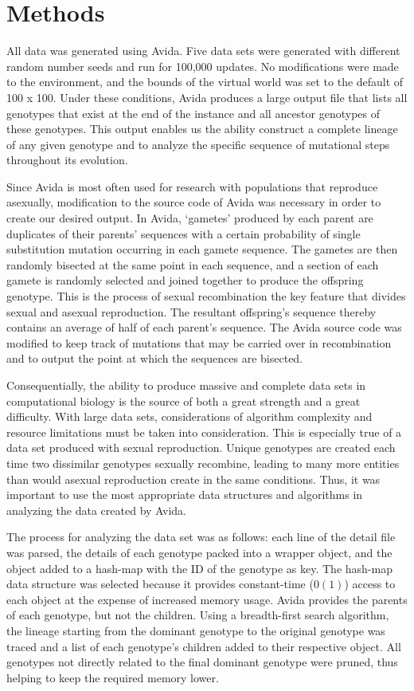 \documentclass[a4paper, 10pt]{article}
\begin{document}
\section{Methods}
All data was generated using Avida. Five data sets were generated with different random number seeds and run for 100,000 updates. No modifications were made to the environment, and the bounds of the virtual world was set to the default of 100 x 100. Under these conditions, Avida produces a large output file that lists all genotypes that exist at the end of the instance and all ancestor genotypes of these genotypes. This output enables us the ability construct a complete lineage of any given genotype and to analyze the specific sequence of mutational steps throughout its evolution. 

Since Avida is most often used for research with populations that reproduce asexually, modification to the source code of Avida was necessary in order to create our desired output. In Avida, `gametes' produced by each parent are duplicates of their parents' sequences with a certain probability of single substitution mutation occurring in each gamete sequence. The gametes are then randomly bisected at the same point in each sequence, and a section of each gamete is randomly selected and joined together to produce the offspring genotype. This is the process of sexual recombination the key feature that divides sexual and asexual reproduction. The resultant offspring's sequence thereby contains an average of half of each parent's sequence. The Avida source code was modified to keep track of mutations that may be carried over in recombination and to output the point at which the sequences are bisected.

Consequentially, the ability to produce massive and complete data sets in computational biology is the source of both a great strength and a great difficulty. With large data sets, considerations of algorithm complexity and resource limitations must be taken into consideration. This is especially true of a data set produced with sexual reproduction. Unique genotypes are created each time two dissimilar genotypes sexually recombine, leading to many more entities than would asexual reproduction create in the same conditions. Thus, it was important to use the most appropriate data structures and algorithms in analyzing the data created by Avida.

The process for analyzing the data set was as follows: each line of the detail file was parsed, the details of each genotype packed into a wrapper object, and the object added to a hash-map with the ID of the genotype as key. The hash-map data structure was selected because it provides constant-time ($0(1)$) access to each object at the expense of increased memory usage. Avida provides the parents of each genotype, but not the children. Using a breadth-first search algorithm, the lineage starting from the dominant genotype to the original genotype was traced and a list of each genotype's children added to their  respective object. All genotypes not directly related to the final dominant genotype were pruned, thus helping to keep the required memory lower. 
\end{document}
